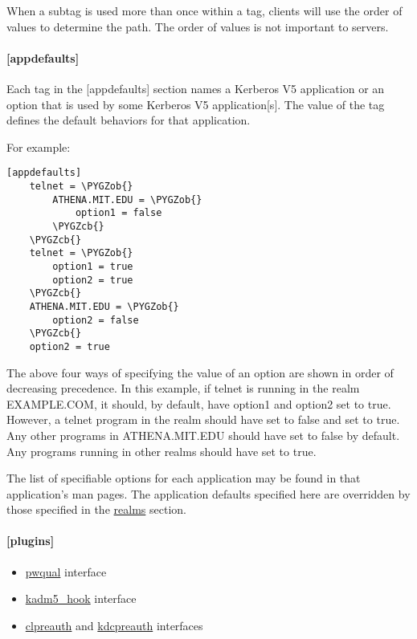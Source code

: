 \documentclass[letterpaper,10pt,english]{sphinxmanual}
\def\PYGZob{\char`\{}
\def\PYGZcb{\char`\}}
\begin{document}
When a subtag is used more than once within a tag, clients will use
the order of values to determine the path.  The order of values is not
important to servers.


\paragraph{{[}appdefaults{]}}
\label{admin/conf_files/krb5_conf:id5}\label{admin/conf_files/krb5_conf:appdefaults}
Each tag in the {[}appdefaults{]} section names a Kerberos V5 application
or an option that is used by some Kerberos V5 application{[}s{]}.  The
value of the tag defines the default behaviors for that application.

For example:

\begin{Verbatim}[commandchars=\\\{\}]
[appdefaults]
    telnet = \PYGZob{}
        ATHENA.MIT.EDU = \PYGZob{}
            option1 = false
        \PYGZcb{}
    \PYGZcb{}
    telnet = \PYGZob{}
        option1 = true
        option2 = true
    \PYGZcb{}
    ATHENA.MIT.EDU = \PYGZob{}
        option2 = false
    \PYGZcb{}
    option2 = true
\end{Verbatim}

The above four ways of specifying the value of an option are shown in
order of decreasing precedence. In this example, if telnet is running
in the realm EXAMPLE.COM, it should, by default, have option1 and
option2 set to true.  However, a telnet program in the realm
 should have  set to false and
 set to true.  Any other programs in ATHENA.MIT.EDU should
have  set to false by default.  Any programs running in
other realms should have  set to true.

The list of specifiable options for each application may be found in
that application's man pages.  The application defaults specified here
are overridden by those specified in the {\hyperref[admin/conf_files/krb5_conf:realms]{realms}} section.


\paragraph{{[}plugins{]}}
\label{admin/conf_files/krb5_conf:id6}\label{admin/conf_files/krb5_conf:plugins}\begin{itemize}
\item {} 
{\hyperref[admin/conf_files/krb5_conf:pwqual]{pwqual}} interface

\item {} 
{\hyperref[admin/conf_files/krb5_conf:kadm5-hook]{kadm5\_hook}} interface

\item {} 
{\hyperref[admin/conf_files/krb5_conf:clpreauth]{clpreauth}} and {\hyperref[admin/conf_files/krb5_conf:kdcpreauth]{kdcpreauth}} interfaces

\end{itemize}
\end{document}
